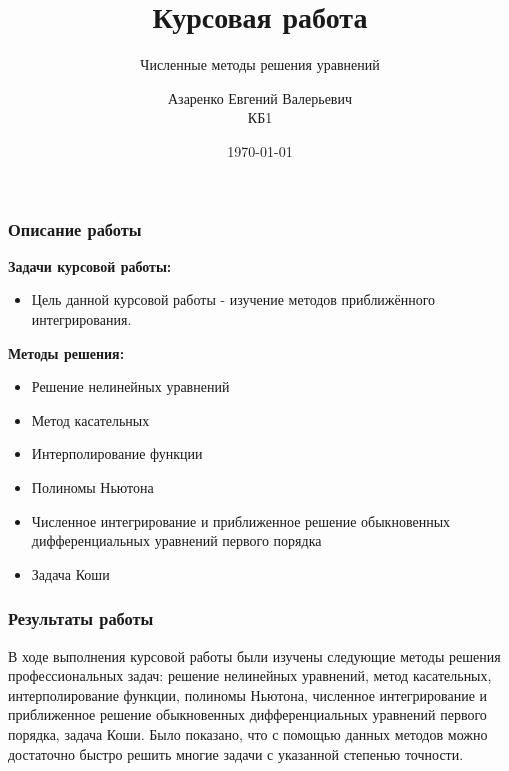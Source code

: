 \documentclass{beamer}
\title{Курсовая работа}
\subtitle{Численные методы решения уравнений}
\author{Азаренко Евгений Валерьевич\\КБ1}
\institute{Балтийский федеральный университет имени Иммануила Канта}
\date{\today}
\begin{document}
	
\begin{frame}
	\titlepage
\end{frame}

\begin{frame}
	\frametitle{Описание работы}
	\textbf{Задачи курсовой работы:}
	\begin{itemize}
		\item Цель данной курсовой работы - изучение методов приближённого интегрирования.
		
	\end{itemize}
	
	\textbf{Методы решения:}
	\begin{itemize}
		\item Решение нелинейных уравнений
		\item Метод касательных
		\item Интерполирование функции
		\item Полиномы Ньютона
		\item Численное интегрирование и приближенное решение обыкновенных дифференциальных уравнений первого порядка
		\item Задача Коши
	\end{itemize}
\end{frame}

\begin{frame}
	\frametitle{Результаты работы}
	В ходе выполнения курсовой работы были изучены следующие методы решения профессиональных задач: решение нелинейных уравнений, метод касательных, интерполирование функции, полиномы Ньютона, численное интегрирование и приближенное решение обыкновенных дифференциальных уравнений первого порядка, задача Коши. Было показано, что с помощью данных методов можно достаточно быстро решить многие задачи с указанной степенью точности.
\end{frame}
\end{document}

